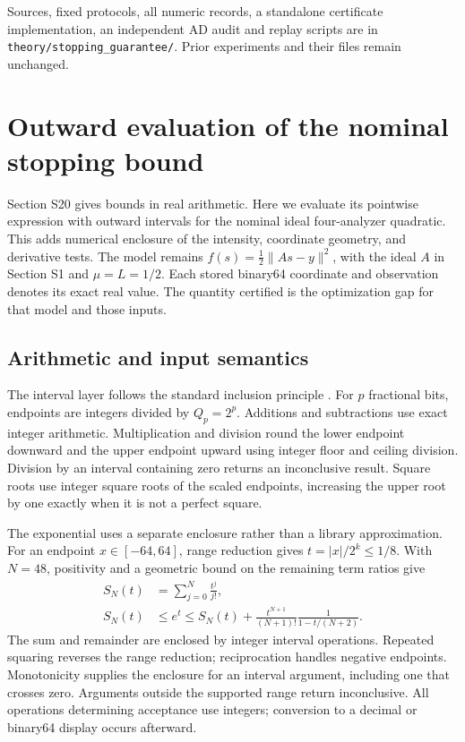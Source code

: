 Sources, fixed protocols, all numeric records, a standalone certificate implementation, an independent AD audit and replay scripts are in \nolinkurl{theory/stopping_guarantee/}. Prior experiments and their files remain unchanged.


\section{Outward evaluation of the nominal stopping bound}
\label{SI-sec:svalidated}
Section S20 gives bounds in real arithmetic. Here we evaluate its pointwise expression with outward intervals for the nominal ideal four-analyzer quadratic. This adds numerical enclosure of the intensity, coordinate geometry, and derivative tests. The model remains $f(s)=\tfrac12\|As-y\|^2$, with the ideal $A$ in Section S1 and $\mu=L=1/2$. Each stored binary64 coordinate and observation denotes its exact real value. The quantity certified is the optimization gap for that model and those inputs.

\subsection{Arithmetic and input semantics}
The interval layer follows the standard inclusion principle \cite[Secs.~5.3--5.5]{supp-rump}. For $p$ fractional bits, endpoints are integers divided by $Q_p=2^p$. Additions and subtractions use exact integer arithmetic. Multiplication and division round the lower endpoint downward and the upper endpoint upward using integer floor and ceiling division. Division by an interval containing zero returns an inconclusive result. Square roots use integer square roots of the scaled endpoints, increasing the upper root by one exactly when it is not a perfect square.

The exponential uses a separate enclosure rather than a library approximation. For an endpoint $x\in[-64,64]$, range reduction gives $t=|x|/2^k\le1/8$. With $N=48$, positivity and a geometric bound on the remaining term ratios give
\begin{equation}
 \begin{aligned}
 S_N(t)&=\sum_{j=0}^{N}\frac{t^j}{j!},\\
 S_N(t)&\le e^t\le S_N(t)+
 \frac{t^{N+1}}{(N+1)!}\frac{1}{1-t/(N+2)}.
 \end{aligned}
 \label{SI-eq:intervalexp}
\end{equation}
The sum and remainder are enclosed by integer interval operations. Repeated squaring reverses the range reduction; reciprocation handles negative endpoints. Monotonicity supplies the enclosure for an interval argument, including one that crosses zero. Arguments outside the supported range return inconclusive. All operations determining acceptance use integers; conversion to a decimal or binary64 display occurs afterward.


